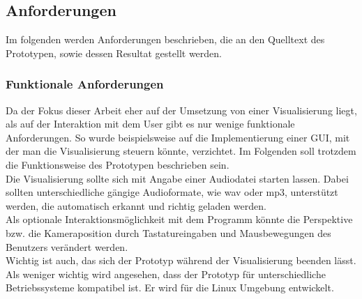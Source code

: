 \documentclass[11pt,a4paper]{article}
\begin{document}
\subsection{Anforderungen}
Im folgenden werden Anforderungen beschrieben, die an den Quelltext des Prototypen, sowie dessen Resultat gestellt werden.

\subsubsection{Funktionale Anforderungen}
Da der Fokus dieser Arbeit eher auf der Umsetzung von einer Visualisierung liegt, als auf der Interaktion mit dem User gibt es nur wenige funktionale Anforderungen. So wurde beispielsweise auf die Implementierung einer GUI, mit der man die Visualisierung steuern könnte, verzichtet. Im Folgenden soll trotzdem die Funktionsweise des Prototypen beschrieben sein.\\
Die Visualisierung sollte sich mit Angabe einer Audiodatei starten lassen. Dabei sollten unterschiedliche gängige Audioformate, wie wav oder mp3, unterstützt werden, die automatisch erkannt und richtig geladen werden.\\
Als optionale Interaktionsmöglichkeit mit dem Programm könnte die Perspektive bzw. die Kameraposition durch Tastatureingaben und Mausbewegungen des Benutzers verändert werden.\\
Wichtig ist auch, das sich der Prototyp während der Visualisierung beenden lässt.\\
Als weniger wichtig wird angesehen, dass der Prototyp für unterschiedliche Betriebssysteme kompatibel ist. Er wird für die Linux Umgebung entwickelt.
\end{document}
